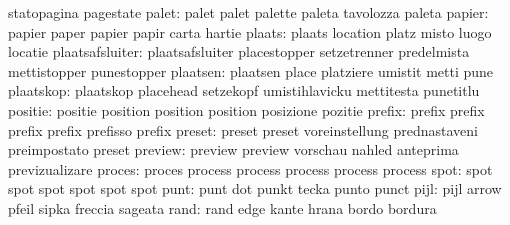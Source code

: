                            statopagina               pagestate %
                    palet: palet                     palet
                           palette                   paleta
                           tavolozza                 paleta
                   papier: papier                    paper
                           papier                    papir
                           carta                     hartie
                   plaats: plaats                    location
                           platz                     misto
                           luogo                     locatie
          plaatsafsluiter: plaatsafsluiter           placestopper
                           setzetrenner              predelmista
                           mettistopper              punestopper %
                 plaatsen: plaatsen                  place
                           platziere                 umistit
                           metti                     pune %
                plaatskop: plaatskop                 placehead
                           setzekopf                 umistihlavicku
                           mettitesta                punetitlu %
                  positie: positie                   position
                           position                  position
                           posizione                 pozitie %
                   prefix: prefix                    prefix
                           prefix                    prefix
                           prefisso                  prefix
                   preset: preset                    preset
                           voreinstellung            prednastaveni
                           preimpostato              preset %
                  preview: preview                   preview
                           vorschau                  nahled
                           anteprima                 previzualizare
proces: proces   process 
        process  process 
        process  process 
  spot: spot spot 
        spot spot 
        spot spot 
                     punt: punt                      dot
                           punkt                     tecka
                           punto                     punct
                     pijl: pijl                      arrow
                           pfeil                     sipka
                           freccia                   sageata
                     rand: rand                      edge
                           kante                     hrana
                           bordo                     bordura
